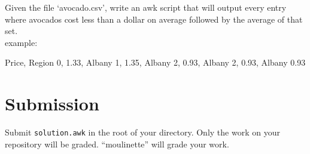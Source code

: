 \documentclass{42-en}
\begin{document}
    Given the file `avocado.csv', write an awk script that will output
    every entry where avocados cost less than a dollar on average followed
    by the average of that set.\\

    example:
    \begin{42console}
Price, Region
0, 1.33, Albany
1, 1.35, Albany
2, 0.93, Albany
2, 0.93, Albany
0.93
%
    \end{42console}

\chapter{Submission}

    Submit \texttt{solution.awk} in the root of your directory.
    Only the work on your repository will be graded.
    ``moulinette'' will grade your work.\\
\end{document}
